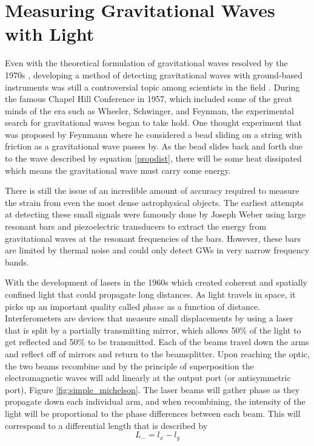 	\section{Measuring Gravitational Waves with Light}\label{measuringGWs}
	Even with the theoretical formulation of gravitational waves resolved by the 1970s \cite{PiraniPhysicalSignificance}, developing a method of detecting gravitational waves with ground-based instruments was still a controversial topic among scientists in the field \cite{CollinsGravity}.  During the famous Chapel Hill Conference in 1957, which included some of the great minds of the era such as Wheeler, Schwinger, and Feynman, the experimental search for gravitational waves began to take hold.  One thought experiment that was proposed by Feynmann \cite{SmootBrief} where he considered a bead sliding on a string with friction as a gravitational wave passes by.  As the bead slides back and forth due to the wave described by equation \ref{propdist}, there will be some heat dissipated which means the gravitational wave must carry some energy.
	
	There is still the issue of an incredible amount of accuracy required to measure the strain from even the most dense astrophysical objects. The earliest attempts at detecting these small signals were famously done by Joseph Weber \cite{Weber} using large resonant bars and piezoelectric transducers to extract the energy from gravitational waves at the resonant frequencies of the bars.  However, these bars are limited by thermal noise and could only detect GWs in very narrow frequency bands. 
	
	With the development of lasers in the 1960s which created coherent and spatially confined light that could propagate long distances.  As light travels in space, it picks up an important quality called $\textit{phase}$ as a function of distance.  Interferometers are devices that measure small displacements by using a laser that is split by a partially transmitting mirror, which allows 50$\%$ of the light to get reflected and 50$\%$ to be transmitted.  Each of the beams travel down the arms and reflect off of mirrors and return to the beamsplitter.  Upon reaching the optic, the two beams recombine and by the principle of superposition  the electromagnetic waves will add linearly at the output port (or antisymmetric port), Figure \ref{fig:simple_michelson}.  The laser beams will gather phase as they propagate down each individual arm, and when recombining, the intensity of the light will be proportional to the phase differences between each beam.  This will correspond to a differential length that is described by
	\begin{equation}
	L_{-} = l_{x} - l_{y}
	\end{equation}
	
